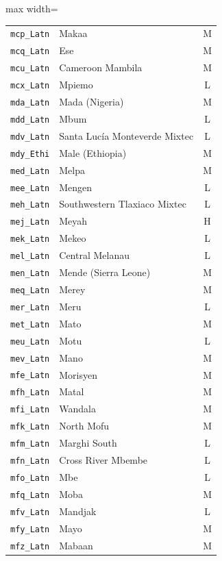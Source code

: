 {\begin{adjustbox}{max width=\textwidth}
\begin{tabular}{llc}
        \texttt{mcp\_Latn} & Makaa & M \\
        \texttt{mcq\_Latn} & Ese & M \\
        \texttt{mcu\_Latn} & Cameroon Mambila & M \\
        \texttt{mcx\_Latn} & Mpiemo & L \\
        \texttt{mda\_Latn} & Mada (Nigeria) & M \\
        \texttt{mdd\_Latn} & Mbum & L \\
        \texttt{mdv\_Latn} & Santa Lucía Monteverde Mixtec & L \\
        \texttt{mdy\_Ethi} & Male (Ethiopia) & M \\
        \texttt{med\_Latn} & Melpa & M \\
        \texttt{mee\_Latn} & Mengen & L \\
        \texttt{meh\_Latn} & Southwestern Tlaxiaco Mixtec & L \\
        \texttt{mej\_Latn} & Meyah & H \\
        \texttt{mek\_Latn} & Mekeo & L \\
        \texttt{mel\_Latn} & Central Melanau & L \\
        \texttt{men\_Latn} & Mende (Sierra Leone) & M \\
        \texttt{meq\_Latn} & Merey & M \\
        \texttt{mer\_Latn} & Meru & L \\
        \texttt{met\_Latn} & Mato & M \\
        \texttt{meu\_Latn} & Motu & L \\
        \texttt{mev\_Latn} & Mano & M \\
        \texttt{mfe\_Latn} & Morisyen & M \\
        \texttt{mfh\_Latn} & Matal & M \\
        \texttt{mfi\_Latn} & Wandala & M \\
        \texttt{mfk\_Latn} & North Mofu & M \\
        \texttt{mfm\_Latn} & Marghi South & L \\
        \texttt{mfn\_Latn} & Cross River Mbembe & L \\
        \texttt{mfo\_Latn} & Mbe & L \\
        \texttt{mfq\_Latn} & Moba & M \\
        \texttt{mfv\_Latn} & Mandjak & L \\
        \texttt{mfy\_Latn} & Mayo & M \\
        \texttt{mfz\_Latn} & Mabaan & M \\

\end{tabular}
\end{adjustbox}}
